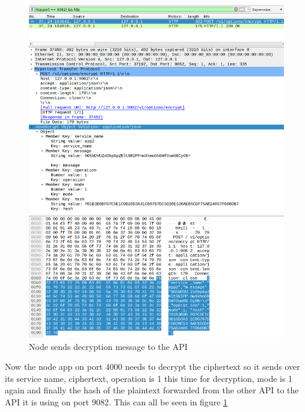 \begin{figure}[!h]
  \centering
      \includegraphics[width=1\textwidth]{Figures/b14.png}
  \caption[Node sends decryption message to the API ]{Node sends decryption message to the API }
  \label{fig:b14}
\end{figure}
\FloatBarrier

Now the node app on port 4000 needs to decrypt the ciphertext so it sends over its service name, ciphertext, operation is 1 this time for decryption, mode is 1 again and finally the hash of the plaintext forwarded from the other API to the API it is using on port 9082. This can all be seen in figure \ref{fig:b14}



